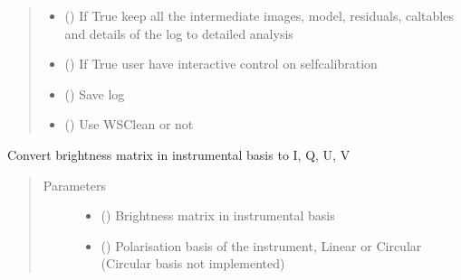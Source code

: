 \documentclass[letterpaper,10pt,english]{sphinxmanual}
\begin{document}
\begin{fulllineitems}
\begin{quote}
\begin{description}
\begin{itemize}
\item {} 
\sphinxAtStartPar
{} () \textendash{} If True keep all the intermediate images, model, residuals, caltables and details of the log to detailed analysis

\item {} 
\sphinxAtStartPar
{} () \textendash{} If True user have interactive control on self\sphinxhyphen{}calibration

\item {} 
\sphinxAtStartPar
{} () \textendash{} Save log

\item {} 
\sphinxAtStartPar
{} () \textendash{} Use WSClean or not

\end{itemize}

\end{description}\end{quote}

\begin{fulllineitems}
\label{\detokenize{paircars:paircars.fullpol_selfcal_LTS.PolSelfcal.B_to_IQUV}}
\sphinxAtStartPar
Convert brightness matrix in instrumental basis to I, Q, U, V
\begin{quote}\begin{description}
\item[{Parameters}] \leavevmode\begin{itemize}
\item {} 
\sphinxAtStartPar
{} () \textendash{} Brightness matrix in instrumental basis

\item {} 
\sphinxAtStartPar
{} () \textendash{} Polarisation basis of the instrument, Linear or Circular (Circular basis not implemented)


\end{itemize}
\end{description}
\end{quote}
\end{fulllineitems}
\end{fulllineitems}
\end{document}
